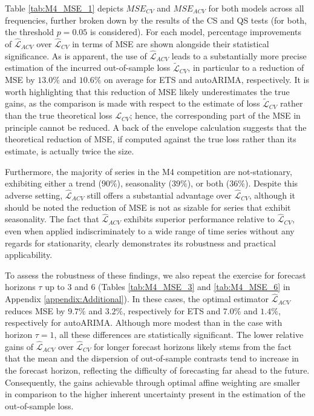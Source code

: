 \documentclass[11pt,dvipsnames]{article}
\begin{document}
Table \ref{tab:M4_MSE_1} depicts $ MSE_{CV} $ and $ MSE_{ACV} $ for both models across all frequencies, further broken down by the results of the CS and QS tests (for both, the threshold $ p=0.05 $ is considered). For each model, percentage improvements of $ \widehat{\mathcal{L}}_{ACV} $ over $ \widehat{\mathcal{L}}_{CV} $ in terms of MSE are shown alongside their statistical significance. As is apparent, the use of $ \widehat{\mathcal{L}}_{ACV} $ leads to a substantially more precise estimation of the incurred out-of-sample loss $ \widetilde{\mathcal{L}}_{CV} $, in particular to a reduction of MSE by $  13.0\% $ and $ 10.6\% $ on average for ETS and autoARIMA, respectively. It is worth highlighting that this reduction of MSE likely underestimates the true gains, as the comparison is made with respect to the estimate of loss $ \widetilde{\mathcal{L}}_{CV} $ rather than the true theoretical loss $ \mathcal{L}_{CV} $; hence, the corresponding part of the MSE in principle cannot be reduced. A back of the envelope calculation suggests that the theoretical reduction of MSE, if computed against the true loss rather than its estimate, is actually twice the size.

Furthermore, the majority of series in the M4 competition are not-stationary, exhibiting either a trend ($ 90\% $), seasonality ($ 39\% $), or both ($ 36\% $). 
Despite this adverse setting, $ \widehat{\mathcal{L}}_{ACV} $ still offers a substantial advantage over $ \widehat{\mathcal{L}}_{CV} $, although it should be noted the reduction of MSE is not as sizable for series that exhibit seasonality. The fact that $ \widehat{\mathcal{L}}_{ACV} $ exhibits superior performance relative to $ \widehat{\mathcal{L}}_{CV} $, even when applied indiscriminately to a wide range of time series without any regards for stationarity, clearly demonstrates its robustness and practical applicability.

To assess the robustness of these findings, we also repeat the exercise for forecast horizons $ \tau $ up to $ 3 $ and $ 6 $ (Tables \ref{tab:M4_MSE_3} and \ref{tab:M4_MSE_6} in Appendix \ref{appendix:Additional}). In these cases, the optimal estimator $ \widehat{\mathcal{L}}_{ACV} $ reduces MSE by $  9.7\% $ and $ 3.2\% $, respectively for ETS and $  7.0\% $ and $ 1.4\% $, respectively for autoARIMA. Although more modest than in the case with horizon $ \tau = 1 $, all these differences are statistically significant. The lower relative gains of $ \widehat{\mathcal{L}}_{ACV} $ over $ \widehat{\mathcal{L}}_{CV} $ for longer forecast horizons likely stems from the fact that the mean and the dispersion of out-of-sample contrasts tend to increase in the forecast horizon, reflecting the difficulty of forecasting far ahead to the future. Consequently, the gains achievable through optimal affine weighting are smaller in comparison to the higher inherent uncertainty present in the estimation of the out-of-sample loss.
\end{document}
